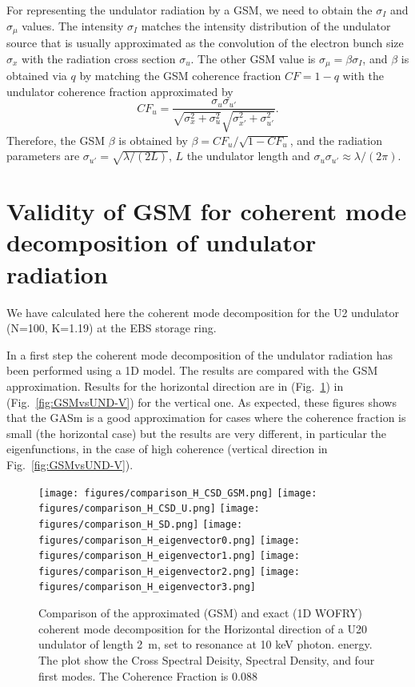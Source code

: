 \documentclass{iucr}              %
\begin{document}
For representing the undulator radiation by a GSM, we need to obtain the $\sigma_I$ and $\sigma_\mu$ values. The intensity $\sigma_I$ matches the intensity distribution of the undulator source that is usually approximated as the convolution of the electron bunch size $\sigma_x$ with the radiation cross section $\sigma_u$. The other GSM value is $\sigma_\mu=\beta\sigma_I$, and $\beta$ is obtained via $q$ by matching the GSM coherence fraction $CF=1-q$ with the undulator coherence fraction approximated by
\begin{equation}
    CF_u = \frac{\sigma_u\sigma_{u'}}{\sqrt{\sigma_x^2+\sigma_u^2}\sqrt{\sigma_{x'}^2+\sigma_{u'}^2}}.
\end{equation}
Therefore, the GSM $\beta$ is obtained by $\beta=CF_u/\sqrt{1-CF_u}$,
and the radiation parameters are $\sigma_{u'}=\sqrt{\lambda/(2L)}$, $L$ the undulator length and $\sigma_u \sigma_{u'} \approx \lambda / (2 \pi)$.


\section{Validity of GSM for coherent mode decomposition of undulator radiation}
\label{appendix:validity}

We have calculated here the coherent mode decomposition for the U2 undulator (N=100, K=1.19) at the EBS storage ring. 

In a first step the coherent mode decomposition of the undulator radiation has been performed using a 1D model. The results are compared with the GSM approximation. Results for the horizontal direction are in (Fig.~\ref{fig:GSMvsUND-H}) in (Fig.~\ref{fig:GSMvsUND-V}) for the vertical one. As expected, these figures shows that the GASm is a good approximation for cases where the coherence fraction is small (the horizontal case) but the results are very different, in particular the eigenfunctions, in the case of high coherence (vertical direction in Fig.~\ref{fig:GSMvsUND-V}).


\begin{figure}
    \centering
    \texttt{[image: figures/comparison\_H\_CSD\_GSM.png]}
    \texttt{[image: figures/comparison\_H\_CSD\_U.png]}
    \texttt{[image: figures/comparison\_H\_SD.png]}
    \texttt{[image: figures/comparison\_H\_eigenvector0.png]}
    \texttt{[image: figures/comparison\_H\_eigenvector1.png]}
    \texttt{[image: figures/comparison\_H\_eigenvector2.png]}
    \texttt{[image: figures/comparison\_H\_eigenvector3.png]}
        
    \caption{Comparison of the approximated (GSM) and exact (1D WOFRY) coherent mode decomposition  for the Horizontal direction of a U20 undulator of length \SI{2}{\meter},  set to resonance at 10 keV photon. energy. The plot show the Cross Spectral Deisity, Spectral Density, and four first modes. The Coherence Fraction is 0.088}
    \label{fig:GSMvsUND-H}
\end{figure}
\end{document}
